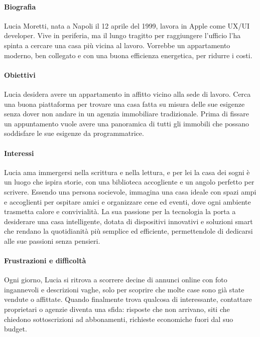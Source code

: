 \paragraph{Biografia}
Lucia Moretti, nata a Napoli il 12 aprile del 1999, lavora in Apple come UX/UI developer. Vive in periferia, ma il lungo tragitto per raggiungere l'ufficio l'ha spinta a cercare una casa più vicina al lavoro. Vorrebbe un appartamento moderno, ben collegato e con una buona efficienza energetica, per ridurre i costi.

\paragraph{Obiettivi}
Lucia desidera avere un appartamento in affitto vicino alla sede di lavoro. Cerca una buona piattaforma per trovare una casa fatta su misura delle sue esigenze senza dover non andare in un agenzia immobiliare tradizionale. Prima di fissare un appuntamento vuole avere una panoramica di tutti gli immobili che possano soddisfare le sue esigenze da programmatrice.

\paragraph{Interessi}
Lucia ama immergersi nella scrittura e nella lettura, e per lei la casa dei sogni è un luogo che ispira storie, con una biblioteca accogliente e un angolo perfetto per scrivere. Essendo una persona socievole, immagina una casa ideale con spazi ampi e accoglienti per ospitare amici e organizzare cene ed eventi, dove ogni ambiente trasmetta calore e convivialità. La sua passione per la tecnologia la porta a desiderare una casa intelligente, dotata di dispositivi innovativi e soluzioni smart che rendano la quotidianità più semplice ed efficiente, permettendole di dedicarsi alle sue passioni senza pensieri.

\paragraph{Frustrazioni e difficoltà}
Ogni giorno, Lucia si ritrova a scorrere decine di annunci online con foto ingannevoli e descrizioni vaghe, solo per scoprire che molte case sono già state vendute o affittate. Quando finalmente trova qualcosa di interessante, contattare proprietari o agenzie diventa una sfida: risposte che non arrivano, siti che chiedono sottoscrizioni ad abbonamenti, richieste economiche fuori dal suo budget.

